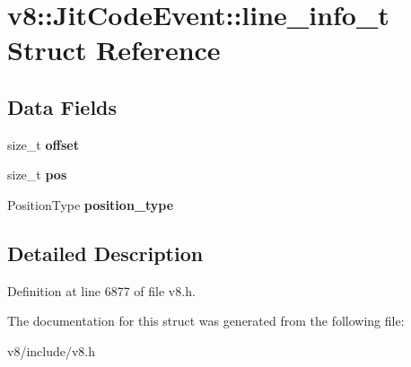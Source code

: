\hypertarget{structv8_1_1JitCodeEvent_1_1line__info__t}{}\section{v8\+:\+:Jit\+Code\+Event\+:\+:line\+\_\+info\+\_\+t Struct Reference}
\label{structv8_1_1JitCodeEvent_1_1line__info__t}
\subsection*{Data Fields}
\begin{DoxyCompactItemize}
\item 
\mbox{\label{structv8_1_1JitCodeEvent_1_1line__info__t_a084f165114adc594e838ef5fe0c879d6}} 
size\+\_\+t {\bfseries offset}
\item 
\mbox{\label{structv8_1_1JitCodeEvent_1_1line__info__t_aad9a3d593ffa9b647b31b67f60ad19f2}} 
size\+\_\+t {\bfseries pos}
\item 
\mbox{\label{structv8_1_1JitCodeEvent_1_1line__info__t_ad8a0e551ed2b67096a3fe2f64e2b77a2}} 
Position\+Type {\bfseries position\+\_\+type}
\end{DoxyCompactItemize}


\subsection{Detailed Description}


Definition at line 6877 of file v8.\+h.



The documentation for this struct was generated from the following file\+:\begin{DoxyCompactItemize}
\item 
v8/include/v8.\+h\end{DoxyCompactItemize}
